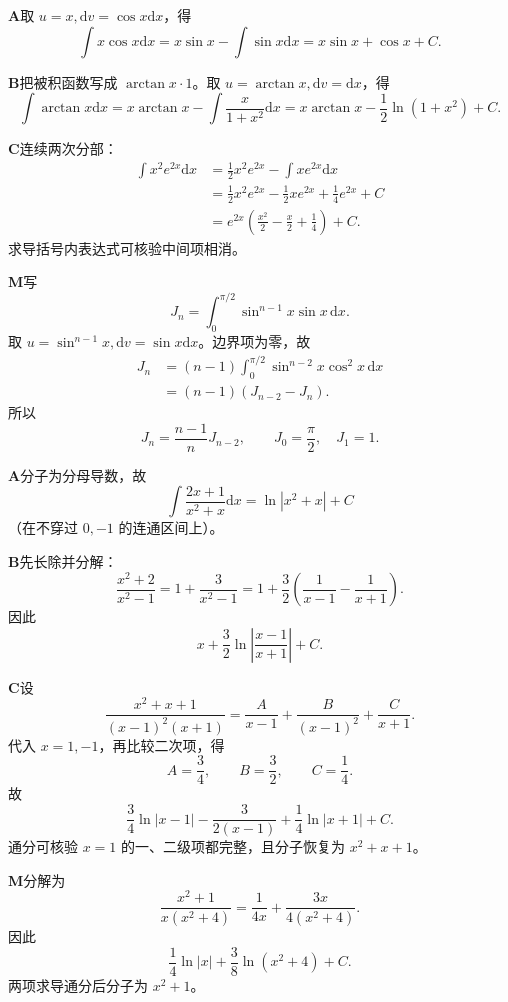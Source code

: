 \begin{solutionBox}
\textbf{A}\quad 取 \(u=x,\mathrm dv=\cos x\mathrm dx\)，得
\[
\int x\cos x\mathrm dx=x\sin x-\int\sin x\mathrm dx
=x\sin x+\cos x+C.
\]
\end{solutionBox}
\begin{solutionBox}
\textbf{B}\quad 把被积函数写成 \(\arctan x\cdot1\)。取
\(u=\arctan x,\mathrm dv=\mathrm dx\)，得
\[
\int\arctan x\mathrm dx
=x\arctan x-\int\frac{x}{1+x^2}\mathrm dx
=x\arctan x-\frac12\ln(1+x^2)+C.
\]
\end{solutionBox}
\begin{solutionBox}
\textbf{C}\quad 连续两次分部：
\[
\begin{aligned}
\int x^2e^{2x}\mathrm dx
&=\frac12x^2e^{2x}-\int xe^{2x}\mathrm dx\\
&=\frac12x^2e^{2x}-\frac12xe^{2x}
+\frac14e^{2x}+C\\
&=e^{2x}\left(\frac{x^2}{2}-\frac x2+\frac14\right)+C.
\end{aligned}
\]
求导括号内表达式可核验中间项相消。
\end{solutionBox}
\begin{solutionBox}
\textbf{M}\quad 写
\[
J_n=\int_0^{\pi/2}\sin^{n-1}x\sin x\,\mathrm dx.
\]
取 \(u=\sin^{n-1}x,\mathrm dv=\sin x\mathrm dx\)。边界项为零，故
\[
\begin{aligned}
J_n
&=(n-1)\int_0^{\pi/2}\sin^{n-2}x\cos^2x\,\mathrm dx\\
&=(n-1)(J_{n-2}-J_n).
\end{aligned}
\]
所以
\[
\boxed{J_n=\frac{n-1}{n}J_{n-2}},
\qquad
J_0=\frac\pi2,\quad J_1=1.
\]
\end{solutionBox}

\begin{solutionBox}
\textbf{A}\quad 分子为分母导数，故
\[
\int\frac{2x+1}{x^2+x}\mathrm dx
=\ln|x^2+x|+C
\]
（在不穿过 \(0,-1\) 的连通区间上）。
\end{solutionBox}
\begin{solutionBox}
\textbf{B}\quad 先长除并分解：
\[
\frac{x^2+2}{x^2-1}
=1+\frac3{x^2-1}
=1+\frac32\left(\frac1{x-1}-\frac1{x+1}\right).
\]
因此
\[
\boxed{x+\frac32\ln\left|\frac{x-1}{x+1}\right|+C}.
\]
\end{solutionBox}
\begin{solutionBox}
\textbf{C}\quad 设
\[
\frac{x^2+x+1}{(x-1)^2(x+1)}
=\frac A{x-1}+\frac B{(x-1)^2}+\frac C{x+1}.
\]
代入 \(x=1,-1\)，再比较二次项，得
\[
A=\frac34,\qquad B=\frac32,\qquad C=\frac14.
\]
故
\[
\boxed{
\frac34\ln|x-1|-\frac{3}{2(x-1)}
+\frac14\ln|x+1|+C
}.
\]
通分可核验 \(x=1\) 的一、二级项都完整，且分子恢复为
\(x^2+x+1\)。
\end{solutionBox}
\begin{solutionBox}
\textbf{M}\quad 分解为
\[
\frac{x^2+1}{x(x^2+4)}
=\frac1{4x}+\frac{3x}{4(x^2+4)}.
\]
因此
\[
\boxed{\frac14\ln|x|+\frac38\ln(x^2+4)+C}.
\]
两项求导通分后分子为 \(x^2+1\)。
\end{solutionBox}

